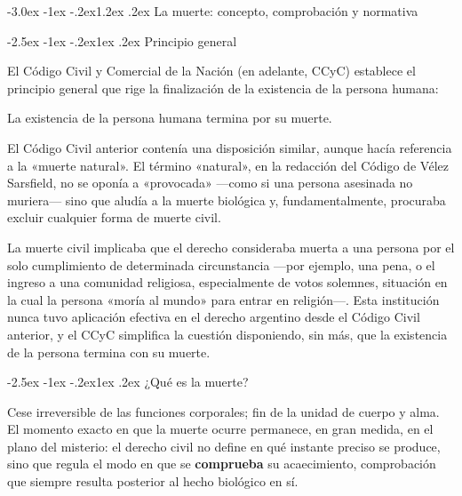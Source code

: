 \documentclass[12pt,oneside]{book}
\makeatletter
\renewcommand\section{\@startsection{section}{1}{\z@}%
  {-3.0ex \@plus -1ex \@minus -.2ex}{1.2ex \@plus .2ex}%
  {\normalfont\large\bfseries\color{acento}}}
\renewcommand\subsection{\@startsection{subsection}{2}{\z@}%
  {-2.5ex \@plus -1ex \@minus -.2ex}{1ex \@plus .2ex}%
  {\normalfont\normalsize\bfseries}}
\makeatother
\begin{document}
\section{La muerte: concepto, comprobación y normativa}

\subsection{Principio general}

El Código Civil y Comercial de la Nación (en adelante, CCyC) establece el principio general que rige la finalización de la existencia de la persona humana:

\begin{regla}
La existencia de la persona humana termina por su muerte.
\end{regla}

El Código Civil anterior contenía una disposición similar, aunque hacía referencia a la «muerte natural». El término «natural», en la redacción del Código de Vélez Sarsfield, no se oponía a «provocada» ---como si una persona asesinada no muriera--- sino que aludía a la muerte biológica y, fundamentalmente, procuraba excluir cualquier forma de muerte civil.

\begin{nota}
La muerte civil implicaba que el derecho consideraba muerta a una persona por el solo cumplimiento de determinada circunstancia ---por ejemplo, una pena, o el ingreso a una comunidad religiosa, especialmente de votos solemnes, situación en la cual la persona «moría al mundo» para entrar en religión---. Esta institución nunca tuvo aplicación efectiva en el derecho argentino desde el Código Civil anterior, y el CCyC simplifica la cuestión disponiendo, sin más, que la existencia de la persona termina con su muerte.
\end{nota}

\subsection{¿Qué es la muerte?}

\begin{definicion}[{Muerte}]
Cese irreversible de las funciones corporales; fin de la unidad de cuerpo y alma. El momento exacto en que la muerte ocurre permanece, en gran medida, en el plano del misterio: el derecho civil no define en qué instante preciso se produce, sino que regula el modo en que se \textbf{comprueba} su acaecimiento, comprobación que siempre resulta posterior al hecho biológico en sí.
\end{definicion}
\end{document}
